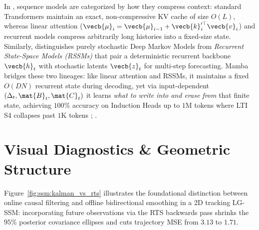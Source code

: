 \documentclass[../../../../master.tex]{subfiles}
\begin{document}
\begin{crossbook}
In , sequence models are categorized by how they compress context: standard Transformers maintain an exact, non-compressive KV cache of size $O(L)$, whereas linear attention ($\vecb{\mu}_i = \vecb{\mu}_{i-1} + \vecb{k}_i^{\prime\top} \vecb{v}_i$) and recurrent models compress arbitrarily long histories into a fixed-size state. Similarly,  distinguishes purely stochastic Deep Markov Models from \emph{Recurrent State-Space Models (RSSMs)} that pair a deterministic recurrent backbone $\vecb{h}_t$ with stochastic latents $\vecb{z}_t$ for multi-step forecasting. Mamba bridges these two lineages: like linear attention and RSSMs, it maintains a fixed $O(DN)$ recurrent state during decoding, yet via input-dependent $(\Delta_t, \mat{B}_t, \mat{C}_t)$ it learns \emph{what to write into and erase from} that finite state, achieving $100\%$ accuracy on Induction Heads up to $1\text{M}$ tokens where LTI S4 collapses past $1\text{K}$ tokens ; .
\end{crossbook}

\section{Visual Diagnostics \& Geometric Structure}\label{sec:ssm:visuals}

Figure~\ref{fig:ssm:kalman_vs_rts} illustrates the foundational distinction between online causal filtering and offline bidirectional smoothing in a 2D tracking LG-SSM: incorporating future observations via the RTS backwards pass shrinks the $95\%$ posterior covariance ellipses and cuts trajectory MSE from $3.13$ to $1.71$.

\end{document}
